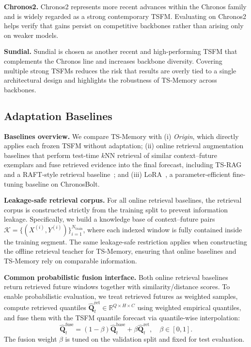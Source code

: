 \noindent\textbf{Chronos2.}
Chronos2 represents more recent advances within the Chronos family and is widely regarded as a strong contemporary TSFM.
Evaluating on Chronos2 helps verify that gains persist on competitive backbones rather than arising only on weaker models.

\noindent\textbf{Sundial.}
Sundial is chosen as another recent and high-performing TSFM that complements the Chronos line and increases backbone diversity.
Covering multiple strong TSFMs reduces the risk that results are overly tied to a single architectural design and highlights the robustness of TS-Memory across backbones.





\subsection{Adaptation Baselines}
\noindent\textbf{Baselines overview.}
We compare TS-Memory with (i) \textit{Origin}, which directly applies each frozen TSFM without adaptation;
(ii) online retrieval augmentation baselines that perform test-time $k$NN retrieval of similar context--future exemplars and fuse retrieved evidence into the final forecast, including TS-RAG~\cite{ning2025ts} and a RAFT-style retrieval baseline~\cite{han2025retrieval}; and
(iii) LoRA~\cite{hu2022lora}, a parameter-efficient fine-tuning baseline on ChronosBolt.

\noindent\textbf{Leakage-safe retrieval corpus.}
For all online retrieval baselines, the retrieval corpus is constructed strictly from the training split to prevent information leakage.
Specifically, we build a knowledge base of context--future pairs
$\mathcal{K}=\{(X^{(i)},Y^{(i)})\}_{i=1}^{N_{\text{train}}}$,
where each indexed window is fully contained inside the training segment.
The same leakage-safe restriction applies when constructing the offline retrieval teacher for TS-Memory, ensuring that online baselines and TS-Memory rely on comparable information.

\noindent\textbf{Common probabilistic fusion interface.}
Both online retrieval baselines return retrieved future windows together with similarity/distance scores.
To enable probabilistic evaluation, we treat retrieved futures as weighted samples, compute retrieved quantiles
$\widehat{\mathbf{Q}}^{\text{ret}}_t \in \mathbb{R}^{Q\times H\times C}$ using weighted empirical quantiles, and fuse them with the TSFM quantile forecast via quantile-wise interpolation:
\begin{equation*}
\widehat{\mathbf{Q}}^{\text{fuse}}_t=(1-\beta)\widehat{\mathbf{Q}}^{\text{base}}_t+\beta\widehat{\mathbf{Q}}^{\text{ret}}_t,\quad \beta\in[0,1].
\end{equation*}
The fusion weight $\beta$ is tuned on the validation split and fixed for test evaluation.

